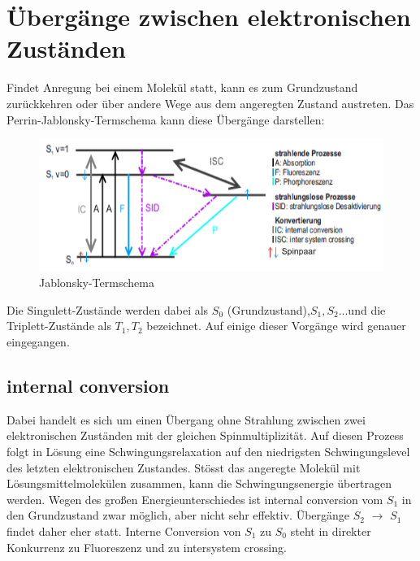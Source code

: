 \newpage
\section{Übergänge zwischen elektronischen Zuständen}
Findet Anregung bei einem Molekül statt, kann es zum Grundzustand zurückkehren oder über andere Wege aus dem angeregten Zustand austreten. Das Perrin-Jablonsky-Termschema kann diese Übergänge darstellen:

\begin{figure}[htbp]
\centering
\includegraphics[scale=0.5]{graphics/Jablonski_Termschema}
\caption{Jablonsky-Termschema \cite{[3]} } 
\end{figure}

Die Singulett-Zustände werden dabei als $S_0$ (Grundzustand),$S_1, S_2$...und die Triplett-Zustände als $T_1, T_2$ bezeichnet. Auf einige dieser Vorgänge wird genauer eingegangen.
\subsection{internal conversion}
Dabei handelt es sich um einen Übergang ohne Strahlung zwischen zwei elektronischen Zuständen mit der gleichen Spinmultiplizität. Auf diesen Prozess folgt in Lösung eine Schwingungsrelaxation auf den niedrigsten Schwingungslevel des letzten elektronischen Zustandes. Stösst das angeregte Molekül mit Lösungsmittelmolekülen zusammen, kann die Schwingungsenergie übertragen werden. Wegen des großen Energieunterschiedes ist internal conversion vom $S_1$ in den Grundzustand zwar möglich, aber nicht sehr effektiv. Übergänge $S_2$ $\rightarrow$ $S_1$ findet daher eher statt. Interne Conversion von $S_1$ zu $S_0$ steht in direkter Konkurrenz zu Fluoreszenz und zu intersystem crossing.
